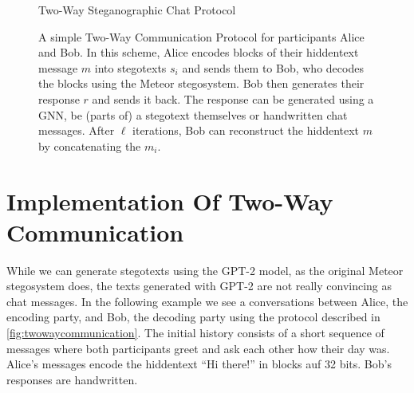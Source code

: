 \begin{figure}[htbp]
	\centering
	\begin{msc}[instance distance=4cm,action width=5cm]{Two-Way Steganographic Chat Protocol}
		\nextlevel[2]
		\nextlevel[3]
		\nextlevel[2]
		\nextlevel[3]
		\nextlevel
		\nextlevel[2]
		\nextlevel[3]
		\nextlevel
		\nextlevel[2]
		\nextlevel[3]
		\nextlevel
	\end{msc}
	\caption{
	A simple Two-Way Communication Protocol for participants Alice and Bob.
	In this scheme, Alice encodes blocks of their hiddentext message $m$ into stegotexts $s_i$ and sends them to Bob, who decodes the blocks using the Meteor stegosystem.
	Bob then generates their response $r$ and sends it back.
	The response can be generated using a GNN, be (parts of) a stegotext themselves or handwritten chat messages.
	After $\ell$ iterations, Bob can reconstruct the hiddentext $m$ by concatenating the $m_i$.
	}
	\label{fig:twowaycommunication}
\end{figure}

\section{Implementation Of Two-Way Communication}
While we can generate stegotexts using the GPT-2 model, as the original Meteor stegosystem does, the texts generated with GPT-2 are not really convincing as chat messages. 
In the following example we see a conversations between Alice, the encoding party, and Bob, the decoding party using the protocol described in \autoref{fig:twowaycommunication}.
The initial history consists of a short sequence of messages where both participants greet and ask each other how their day was.
Alice's messages encode the hiddentext ``Hi there!'' in blocks auf 32 bits. 
Bob's responses are handwritten.

